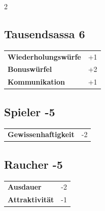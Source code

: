 \begin{multicols}{2}
\begin{tcolorbox}
    \subsection*{Tausendsassa \hfill \small{6 }}
    \tcblower




\begin{tabular}{@{}ll@{}}
    \textbf{Wiederholungswürfe} & +1\\
    \textbf{Bonuswürfel} & +2\\
    \textbf{Kommunikation} & +1\\
\end{tabular}


\end{tcolorbox}

\begin{tcolorbox}
    \subsection*{Spieler \hfill \small{-5 }}
    \tcblower




\begin{tabular}{@{}ll@{}}
    \textbf{Gewissenhaftigkeit} & -2\\
\end{tabular}


\end{tcolorbox}

\begin{tcolorbox}
    \subsection*{Raucher \hfill \small{-5 }}
    \tcblower




\begin{tabular}{@{}ll@{}}
    \textbf{Ausdauer} & -2\\
    \textbf{Attraktivität} & -1\\
\end{tabular}


\end{tcolorbox}
\end{multicols}
